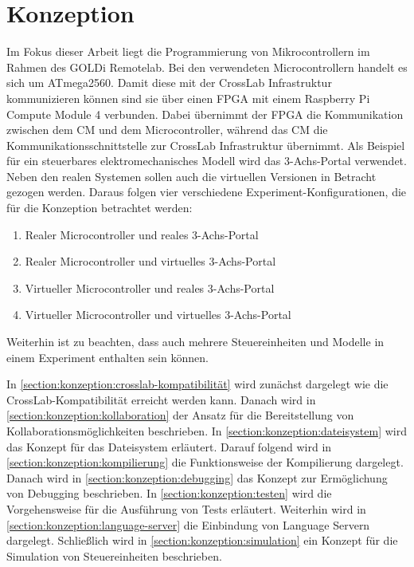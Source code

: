 \chapter{Konzeption}\label{section:konzeption}

Im Fokus dieser Arbeit liegt die Programmierung von Mikrocontrollern im Rahmen des GOLDi Remotelab. Bei den verwendeten Microcontrollern handelt es sich um ATmega2560. Damit diese mit der CrossLab Infrastruktur kommunizieren können sind sie über einen FPGA mit einem Raspberry Pi Compute Module 4 verbunden. Dabei übernimmt der FPGA die Kommunikation zwischen dem CM und dem Microcontroller, während das CM die Kommunikationsschnittstelle zur CrossLab Infrastruktur übernimmt. Als Beispiel für ein steuerbares elektromechanisches Modell wird das 3-Achs-Portal verwendet. Neben den realen Systemen sollen auch die virtuellen Versionen in Betracht gezogen werden. Daraus folgen vier verschiedene Experiment-Konfigurationen, die für die Konzeption betrachtet werden:

\begin{enumerate}
    \item Realer Microcontroller und reales 3-Achs-Portal
    \item Realer Microcontroller und virtuelles 3-Achs-Portal
    \item Virtueller Microcontroller und reales 3-Achs-Portal
    \item Virtueller Microcontroller und virtuelles 3-Achs-Portal
\end{enumerate}

Weiterhin ist zu beachten, dass auch mehrere Steuereinheiten und Modelle in einem Experiment enthalten sein können.

In \autoref{section:konzeption:crosslab-kompatibilität} wird zunächst dargelegt wie die CrossLab-Kompatibilität erreicht werden kann. Danach wird in \autoref{section:konzeption:kollaboration} der Ansatz für die Bereitstellung von Kollaborationsmöglichkeiten beschrieben. In \autoref{section:konzeption:dateisystem} wird das Konzept für das Dateisystem erläutert. Darauf folgend wird in \autoref{section:konzeption:kompilierung} die Funktionsweise der Kompilierung dargelegt. Danach wird in \autoref{section:konzeption:debugging} das Konzept zur Ermöglichung von Debugging beschrieben. In \autoref{section:konzeption:testen} wird die Vorgehensweise für die Ausführung von Tests erläutert. Weiterhin wird in \autoref{section:konzeption:language-server} die Einbindung von Language Servern dargelegt. Schließlich wird in \autoref{section:konzeption:simulation} ein Konzept für die Simulation von Steuereinheiten beschrieben.








